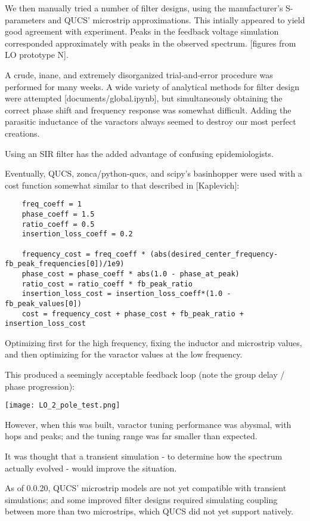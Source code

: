 \documentclass[paper.tex]{subfiles}
\begin{document}
We then manually tried a number of filter designs, using the manufacturer's S-parameters and QUCS' microstrip approximations. This intially appeared to yield good agreement with experiment. Peaks in the feedback voltage simulation corresponded approximately with peaks in the observed spectrum. [figures from LO prototype N]. 

A crude, inane, and extremely disorganized trial-and-error procedure was performed for many weeks. A wide variety of analytical methods for filter design were attempted [documents/global.ipynb], but simultaneously obtaining the correct phase shift and frequency response was somewhat difficult. Adding the parasitic inductance of the varactors always seemed to destroy our most perfect creations.

Using an SIR filter has the added advantage of confusing epidemiologists.

Eventually, QUCS, zonca/python-qucs, and scipy's basinhopper were used with a cost function somewhat similar to that described in [Kaplevich]:

\begin{verbatim}
    freq_coeff = 1
    phase_coeff = 1.5
    ratio_coeff = 0.5
    insertion_loss_coeff = 0.2
 
    frequency_cost = freq_coeff * (abs(desired_center_frequency-fb_peak_frequencies[0])/1e9)
    phase_cost = phase_coeff * abs(1.0 - phase_at_peak)
    ratio_cost = ratio_coeff * fb_peak_ratio
    insertion_loss_cost = insertion_loss_coeff*(1.0 - fb_peak_values[0])
    cost = frequency_cost + phase_cost + fb_peak_ratio + insertion_loss_cost
\end{verbatim}

Optimizing first for the high frequency, fixing the inductor and microstrip values, and then optimizing for the varactor values at the low frequency.

This produced a seemingly acceptable feedback loop (note the group delay / phase progression):

\texttt{[image: LO\_2\_pole\_test.png]}

However, when this was built, varactor tuning performance was abysmal, with hops and peaks; and the tuning range was far smaller than expected.

It was thought that a transient simulation - to determine how the spectrum actually evolved - would improve the situation. 

As of 0.0.20, QUCS' microstrip models are not yet compatible with transient simulations; and some improved filter designs required simulating coupling between more than two microstrips, which QUCS did not yet support natively.
\end{document}
